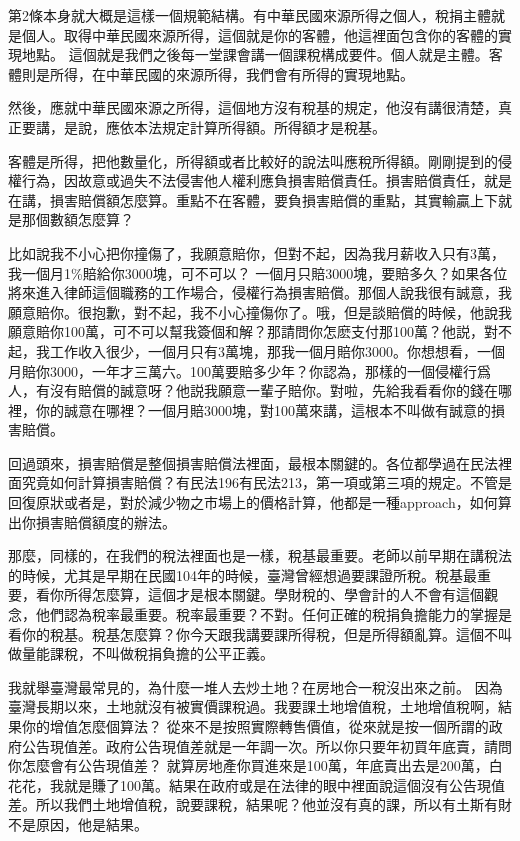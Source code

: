 \documentclass[]{ctexbook}
\begin{document}
第2條本身就大概是這樣一個規範結構。有中華民國來源所得之個人，稅捐主體就是個人。取得中華民國來源所得，這個就是你的客體，他這裡面包含你的客體的實現地點。
這個就是我們之後每一堂課會講一個課稅構成要件。個人就是主體。客體則是所得，在中華民國的來源所得，我們會有所得的實現地點。

然後，應就中華民國來源之所得，這個地方沒有稅基的規定，他沒有講很清楚，真正要講，是說，應依本法規定計算所得額。所得額才是稅基。

客體是所得，把他數量化，所得額或者比較好的說法叫應稅所得額。剛剛提到的侵權行為，因故意或過失不法侵害他人權利應負損害賠償責任。損害賠償責任，就是在講，損害賠償額怎麼算。重點不在客體，要負損害賠償的重點，其實輸贏上下就是那個數額怎麼算？

比如說我不小心把你撞傷了，我願意賠你，但對不起，因為我月薪收入只有3萬，我一個月1\%賠給你3000塊，可不可以？ 一個月只賠3000塊，要賠多久？如果各位將來進入律師這個職務的工作場合，侵權行為損害賠償。那個人說我很有誠意，我願意賠你。很抱歉，對不起，我不小心撞傷你了。哦，但是談賠償的時候，他說我願意賠你100萬，可不可以幫我簽個和解？那請問你怎麽支付那100萬？他説，對不起，我工作收入很少，一個月只有3萬塊，那我一個月賠你3000。你想想看，一個月賠你3000，一年才三萬六。100萬要賠多少年？你認為，那樣的一個侵權行爲人，有沒有賠償的誠意呀？他説我願意一輩子賠你。對啦，先給我看看你的錢在哪裡，你的誠意在哪裡？一個月賠3000塊，對100萬來講，這根本不叫做有誠意的損害賠償。

回過頭來，損害賠償是整個損害賠償法裡面，最根本關鍵的。各位都學過在民法裡面究竟如何計算損害賠償？有民法196有民法213，第一項或第三項的規定。不管是回復原狀或者是，對於減少物之市場上的價格計算，他都是一種approach，如何算出你損害賠償額度的辦法。

那麼，同樣的，在我們的稅法裡面也是一樣，稅基最重要。老師以前早期在講稅法的時候，尤其是早期在民國104年的時候，臺灣曾經想過要課證所稅。稅基最重要，看你所得怎麼算，這個才是根本關鍵。學財稅的、學會計的人不會有這個觀念，他們認為稅率最重要。稅率最重要？不對。任何正確的稅捐負擔能力的掌握是看你的稅基。稅基怎麼算？你今天跟我講要課所得稅，但是所得額亂算。這個不叫做量能課稅，不叫做稅捐負擔的公平正義。

我就舉臺灣最常見的，為什麼一堆人去炒土地？在房地合一稅沒出來之前。 因為臺灣長期以來，土地就沒有被實價課稅過。我要課土地增值稅，土地增值稅啊，結果你的增值怎麼個算法？ 從來不是按照實際轉售價值，從來就是按一個所謂的政府公告現值差。政府公告現值差就是一年調一次。所以你只要年初買年底賣，請問你怎麼會有公告現值差？ 就算房地產你買進來是100萬，年底賣出去是200萬，白花花，我就是賺了100萬。結果在政府或是在法律的眼中裡面說這個沒有公告現值差。所以我們土地增值稅，說要課稅，結果呢？他並沒有真的課，所以有土斯有財不是原因，他是結果。
\end{document}
